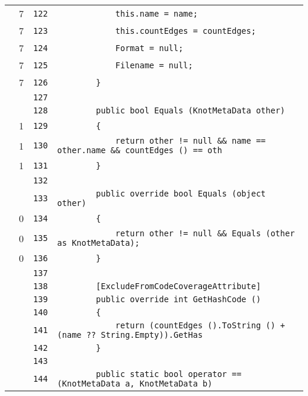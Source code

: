 \documentclass[a4paper,10pt]{article}
\begin{document}
\begin{longtable}[l]{lrrl}
\cellcolor{green} & 7 & \verb~122~ & \verb~            this.name = name;~\\
\cellcolor{green} & 7 & \verb~123~ & \verb~            this.countEdges = countEdges;~\\
\cellcolor{green} & 7 & \verb~124~ & \verb~            Format = null;~\\
\cellcolor{green} & 7 & \verb~125~ & \verb~            Filename = null;~\\
\cellcolor{green} & 7 & \verb~126~ & \verb~        }~\\
\cellcolor{gray} &  & \verb~127~ & \verb~~\\
\cellcolor{gray} &  & \verb~128~ & \verb~        public bool Equals (KnotMetaData other)~\\
\cellcolor{green} & 1 & \verb~129~ & \verb~        {~\\
\cellcolor{green} & 1 & \verb~130~ & \verb~            return other != null && name == other.name && countEdges () == oth~\\
\cellcolor{green} & 1 & \verb~131~ & \verb~        }~\\
\cellcolor{gray} &  & \verb~132~ & \verb~~\\
\cellcolor{gray} &  & \verb~133~ & \verb~        public override bool Equals (object other)~\\
\cellcolor{red} & 0 & \verb~134~ & \verb~        {~\\
\cellcolor{red} & 0 & \verb~135~ & \verb~            return other != null && Equals (other as KnotMetaData);~\\
\cellcolor{red} & 0 & \verb~136~ & \verb~        }~\\
\cellcolor{gray} &  & \verb~137~ & \verb~~\\
\cellcolor{gray} &  & \verb~138~ & \verb~        [ExcludeFromCodeCoverageAttribute]~\\
\cellcolor{gray} &  & \verb~139~ & \verb~        public override int GetHashCode ()~\\
\cellcolor{gray} &  & \verb~140~ & \verb~        {~\\
\cellcolor{gray} &  & \verb~141~ & \verb~            return (countEdges ().ToString () + (name ?? String.Empty)).GetHas~\\
\cellcolor{gray} &  & \verb~142~ & \verb~        }~\\
\cellcolor{gray} &  & \verb~143~ & \verb~~\\
\cellcolor{gray} &  & \verb~144~ & \verb~        public static bool operator == (KnotMetaData a, KnotMetaData b)~\\

\end{longtable}
\end{document}
